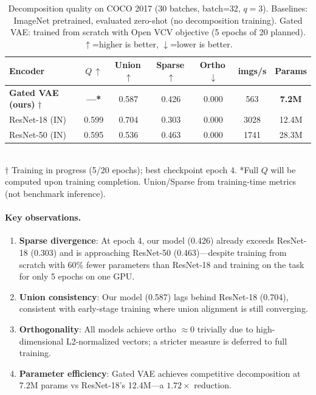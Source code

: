 \documentclass[10pt,twocolumn]{article}
\begin{document}
\begin{table}[h]
\centering\small
\caption{Decomposition quality on COCO 2017 (30 batches, batch=32, $q{=}3$).
Baselines: ImageNet pretrained, evaluated zero-shot (no decomposition training).
Gated VAE: trained from scratch with Open VCV objective (5 epochs of 20 planned).
$\uparrow$=higher is better, $\downarrow$=lower is better.}
\label{tab:main}
\begin{tabular}{lcccccc}
\toprule
Encoder & $Q$\,{\small$\uparrow$} & Union\,{\small$\uparrow$} &
Sparse\,{\small$\uparrow$} & Ortho\,{\small$\downarrow$} & imgs/s & Params \\
\midrule
\textbf{Gated VAE (ours)} $\dagger$ & \textbf{---*} & 0.587 & 0.426 & 0.000 & 563 & \textbf{7.2M} \\
ResNet-18 (IN)       & 0.599 & 0.704 & 0.303 & 0.000 & 3028 & 12.4M \\
ResNet-50 (IN)       & 0.595 & 0.536 & 0.463 & 0.000 & 1741 & 28.3M \\
\bottomrule
\end{tabular}
\smallskip\\
{\footnotesize $\dagger$ Training in progress (5/20 epochs); best checkpoint epoch 4.
*Full $Q$ will be computed upon training completion.
Union/Sparse from training-time metrics (not benchmark inference).}
\end{table}

\paragraph{Key observations.}
\begin{enumerate}[leftmargin=*, nosep]
\item \textbf{Sparse divergence}: At epoch 4, our model (0.426) already exceeds
ResNet-18 (0.303) and is approaching ResNet-50 (0.463)---despite training from
scratch with 60\% fewer parameters than ResNet-18 and training on the task for
only 5 epochs on one GPU.
\item \textbf{Union consistency}: Our model (0.587) lags behind ResNet-18 (0.704),
consistent with early-stage training where union alignment is still converging.
\item \textbf{Orthogonality}: All models achieve ortho $\approx 0$ trivially due to
high-dimensional L2-normalized vectors; a stricter measure is deferred to full training.
\item \textbf{Parameter efficiency}: Gated VAE achieves competitive decomposition at
7.2M params vs ResNet-18's 12.4M---a $1.72\times$ reduction.
\end{enumerate}
\end{document}

